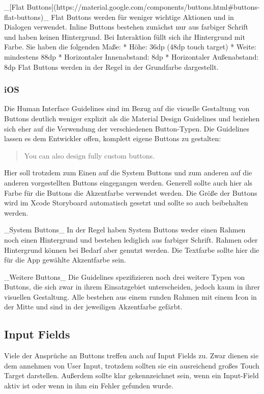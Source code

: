 _[Flat Buttons](https://material.google.com/components/buttons.html#buttons-flat-buttons)_
Flat Buttons werden für weniger wichtige Aktionen und in Dialogen verwendet. Inline Buttons bestehen zunächst nur aus farbiger Schrift und haben keinen Hintergrund. Bei Interaktion füllt sich ihr Hintergrund mit Farbe. Sie haben die folgenden Maße:
* Höhe: 36dp (48dp touch target)
* Weite: mindestens 88dp
* Horizontaler Innenabstand: 8dp
* Horizontaler Außenabstand: 8dp
Flat Buttons werden in der Regel in der Grundfarbe dargestellt.

\subsubsection{iOS}
Die Human Interface Guidelines sind im Bezug auf die visuelle Gestaltung von Buttons deutlich weniger explizit als die Material Design Guidelines und beziehen sich eher auf die Verwendung der verschiedenen Button-Typen. Die Guidelines lassen es dem Entwickler offen, komplett eigene Buttons zu gestalten:

\begin{quote}
You can also design fully custom buttons.
\end{quote}

Hier soll trotzdem zum Einen auf die System Buttons und zum anderen auf die anderen vorgestellten Buttons eingegangen werden. Generell sollte auch hier als Farbe für die Buttons die Akzentfarbe verwendet werden. Die Größe der Buttons wird im Xcode Storyboard automatisch gesetzt und sollte so auch beibehalten werden.

_System Buttons_
In der Regel haben System Buttons weder einen Rahmen noch einen Hintergrund und bestehen lediglich aus farbiger Schrift. Rahmen oder Hintergrund können bei Bedarf aber genutzt werden. Die Textfarbe sollte hier die für die App gewählte Akzentfarbe sein.

_Weitere Buttons_
Die Guidelines spezifizieren noch drei weitere Typen von Buttons, die sich zwar in ihrem Einsatzgebiet unterscheiden, jedoch kaum in ihrer visuellen Gestaltung. Alle bestehen aus einem runden Rahmen mit einem Icon in der Mitte und sind in der jeweiligen Akzentfarbe gefärbt.

\subsection{Input Fields}
Viele der Ansprüche an Buttons treffen auch auf Input Fields zu. Zwar dienen sie dem annehmen von User Input, trotzdem sollten sie ein ausreichend großes Touch Target darstellen.  Außerdem sollte klar gekennzeichnet sein, wenn ein Input-Field aktiv ist oder wenn in ihm ein Fehler gefunden wurde.

